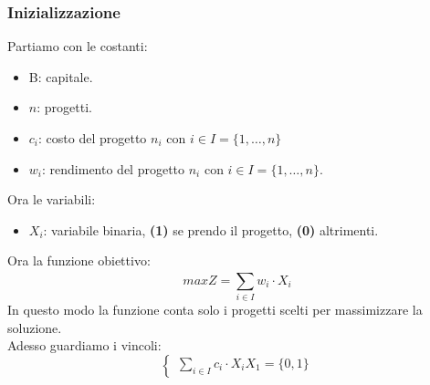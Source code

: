 \documentclass[12pt,a4paper]{article}
\begin{document}
\subsubsection{Inizializzazione}
Partiamo con le costanti:
\begin{itemize}
    \item B: capitale.
    \item $n$: progetti.
    \item $c_i$: costo del progetto $n_i$ con $i \in I = \{1,\ldots,n\}$
    \item $w_i$: rendimento del progetto $n_i$ con $i \in I = \{1,\ldots,n\}$.
\end{itemize}
Ora le variabili:
\begin{itemize}
    \item $X_i$: variabile binaria, \textbf{(1)} se prendo il progetto, \textbf{(0)} altrimenti.
\end{itemize}
Ora la funzione obiettivo:
\[
maxZ = \sum_{i \in I}^{} w_i \cdot X_i
\]
In questo modo la funzione conta solo i progetti scelti per massimizzare la soluzione.\\
Adesso guardiamo i vincoli:
\[
\begin{cases}
    \sum_{i \in I}^{} c_i \cdot X_i
    X_1 = \{0,1\}
\end{cases}
\]
\end{document}
